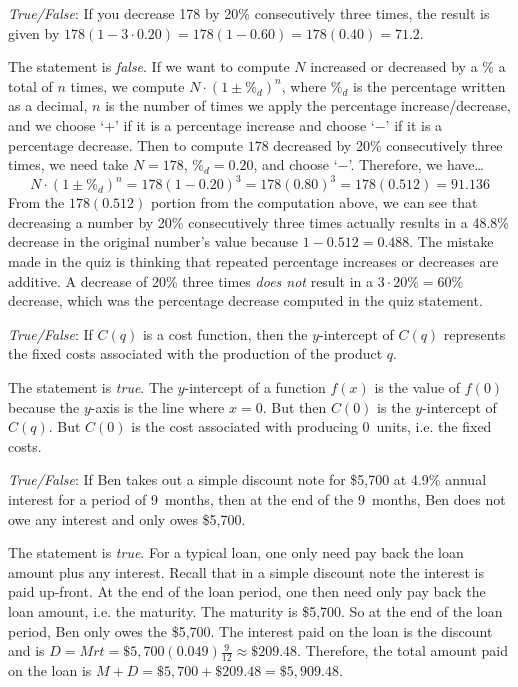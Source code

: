 \documentclass[11pt,letterpaper]{article}
\begin{document}
\thispagestyle{title}

\quizsol \textit{True/False}: If you decrease 178 by 20\% consecutively three times, the result is given by $178 (1 - 3 \cdot 0.20)= 178(1 - 0.60)= 178(0.40)= 71.2$.  \pspace

\sol The statement is \textit{false}. If we want to compute $N$ increased or decreased by a \% a total of $n$ times, we compute $N \cdot (1 \pm \%_d)^n$, where $\%_d$ is the percentage written as a decimal, $n$ is the number of times we apply the percentage increase/decrease, and we choose `$+$' if it is a percentage increase and choose `$-$' if it is a percentage decrease. Then to compute $178$ decreased by 20\% consecutively three times, we need take $N= 178$, $\%_d= 0.20$, and choose `$-$'. Therefore, we have\dots
	\[
	N \cdot (1 \pm \%_d)^n= 178 (1 - 0.20)^3= 178(0.80)^3= 178(0.512)= 91.136
	\]
From the $178(0.512)$ portion from the computation above, we can see that decreasing a number by 20\% consecutively three times actually results in a 48.8\% decrease in the original number's value because $1 - 0.512= 0.488$. The mistake made in the quiz is thinking that repeated percentage increases or decreases are additive. A decrease of 20\% three times \textit{does not} result in a $3 \cdot 20\%= 60\%$ decrease, which was the percentage decrease computed in the quiz statement. \pvspace{1.3cm}



\quizsol \textit{True/False}: If $C(q)$ is a cost function, then the $y$-intercept of $C(q)$ represents the fixed costs associated with the production of the product $q$. \pspace

\sol The statement is \textit{true}. The $y$-intercept of a function $f(x)$ is the value of $f(0)$ because the $y$-axis is the line where $x= 0$. But then $C(0)$ is the $y$-intercept of $C(q)$. But $C(0)$ is the cost associated with producing $0$~units, i.e. the fixed costs. \pvspace{1.3cm}



\quizsol \textit{True/False}: If Ben takes out a simple discount note for \$5,700 at 4.9\% annual interest for a period of 9~months, then at the end of the 9~months, Ben does not owe any interest and only owes \$5,700. \pspace

\sol The statement is \textit{true}. For a typical loan, one only need pay back the loan amount plus any interest. Recall that in a simple discount note the interest is paid up-front. At the end of the loan period, one then need only pay back the loan amount, i.e. the maturity. The maturity is \$5,700. So at the end of the loan period, Ben only owes the \$5,700. The interest paid on the loan is the discount and is $D= Mrt= \$5,\!700(0.049) \frac{9}{12} \approx \$209.48$. Therefore, the total amount paid on the loan is $M + D= \$5,\!700 + \$209.48= \$5,\!909.48$. \pvspace{1.3cm}
\end{document}

